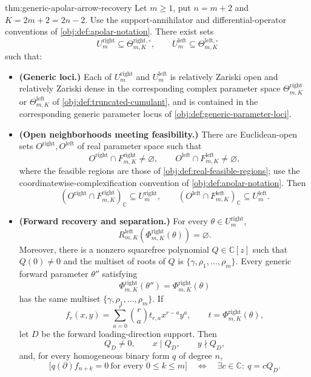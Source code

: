\documentclass[11pt]{article}
\begin{document}
\begin{theoremv}{thm:generic-apolar-arrow-recovery}
Let \(m\geq 1\), put \(n=m+2\) and \(K=2m+2=2n-2\). Use the support-annihilator and differential-operator conventions of \cref{obj:def:apolar-notation}.  There exist sets
\[
U_m^{\mathrm{right}}\subseteq \Theta^{\mathrm{right},\circ}_{m,K},
\qquad
U_m^{\mathrm{left}}\subseteq \Theta^{\mathrm{left},\circ}_{m,K}
\]
such that:

\begin{itemize}
\item \textbf{(Generic loci.)} Each of \(U_m^{\mathrm{right}}\) and \(U_m^{\mathrm{left}}\) is relatively Zariski open and relatively Zariski dense in the corresponding complex parameter space \(\Theta^{\mathrm{right}}_{m,K}\) or \(\Theta^{\mathrm{left}}_{m,K}\) of \cref{obj:def:truncated-cumulant}, and is contained in the corresponding generic parameter locus of \cref{obj:def:generic-parameter-loci}.

\item \textbf{(Open neighborhoods meeting feasibility.)} There are Euclidean-open sets \(O^{\mathrm{right}},O^{\mathrm{left}}\) of real parameter space such that
\[
O^{\mathrm{right}}\cap F^{\mathrm{right}}_{m,K}\neq\varnothing,
\qquad
O^{\mathrm{left}}\cap F^{\mathrm{left}}_{m,K}\neq\varnothing,
\]
where the feasible regions are those of \cref{obj:def:real-feasible-regions}; use the coordinatewise-complexification convention of \cref{obj:def:apolar-notation}. Then
\[
\left(O^{\mathrm{right}}\cap F^{\mathrm{right}}_{m,K}\right)_{\mathbb C}
 \subseteq U_m^{\mathrm{right}},
\qquad
\left(O^{\mathrm{left}}\cap F^{\mathrm{left}}_{m,K}\right)_{\mathbb C}
 \subseteq U_m^{\mathrm{left}}.
\]

\item \textbf{(Forward recovery and separation.)} For every \(\theta\in U_m^{\mathrm{right}}\),
\[
R^{\mathrm{left}}_{m,K}\!\left(\Phi^{\mathrm{right}}_{m,K}(\theta)\right)=\varnothing.
\]
Moreover, there is a nonzero squarefree polynomial \(Q\in\mathbb C[z]\) such that
\(Q(0)\neq0\) and the multiset of roots of \(Q\) is
\(\{\gamma,\rho_1,\ldots,\rho_m\}\). Every generic forward parameter \(\theta''\) satisfying
\[
\Phi^{\mathrm{right}}_{m,K}(\theta'')=
\Phi^{\mathrm{right}}_{m,K}(\theta)
\]
has the same multiset \(\{\gamma,\rho_1,\ldots,\rho_m\}\).  If
\[
f_r(x,y)=\sum_{a=0}^{r}\binom{r}{a}t_{r,a}x^{r-a}y^a,
\qquad
t=\Phi^{\mathrm{right}}_{m,K}(\theta),
\]
let \(D\) be the forward loading-direction support. Then
\[
Q_D\neq0,\qquad x\mid Q_D,\qquad y\nmid Q_D,
\]
and, for every homogeneous binary form \(q\) of degree \(n\),
\[
\bigl[q(\partial)f_{n+k}=0\ \text{for every }0\leq k\leq m\bigr]
\quad\Longleftrightarrow\quad
\exists c\in\mathbb C:\ q=cQ_D.
\]


\end{itemize}
\end{theoremv}
\end{document}
